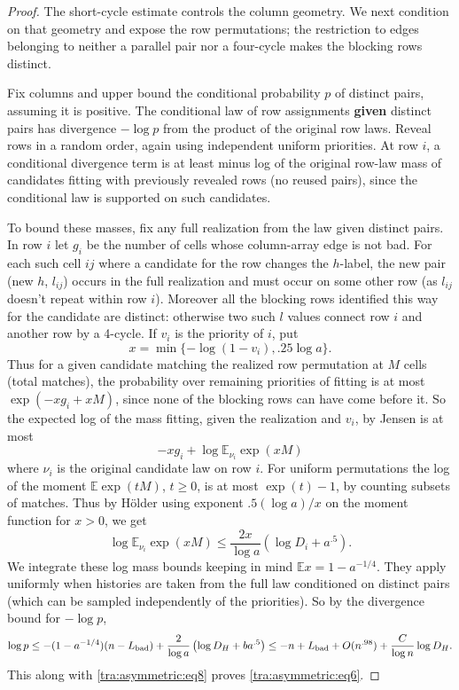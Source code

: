 \begin{proof}
The short-cycle estimate controls the column geometry. We next
condition on that geometry and expose the row permutations; the
restriction to edges belonging to neither a parallel pair nor a
four-cycle makes the blocking rows distinct.

Fix columns and upper bound the conditional probability \(p\) of distinct pairs, assuming it is positive. The conditional law of row assignments \textbf{given} distinct pairs has divergence \(-\log p\) from the product of the original row laws. Reveal rows in a random order, again using independent uniform priorities. At row \(i\), a conditional divergence term is at least minus log of the original row-law mass of candidates fitting with previously revealed rows (no reused pairs), since the conditional law is supported on such candidates.

To bound these masses, fix any full realization from the law given distinct pairs. In row \(i\) let \(g_i\) be the number of cells whose column-array edge is not bad. For each such cell \(ij\) where a candidate for the row changes the \(h\)-label, the new pair (new \(h\), \(l_{ij}\)) occurs in the full realization and must occur on some other row (as \(l_{ij}\) doesn't repeat within row \(i\)). Moreover all the blocking rows identified this way for the candidate are distinct: otherwise two such \(l\) values connect row \(i\) and another row by a 4-cycle. If \(v_i\) is the priority of \(i\), put
\[
                  x=\min\{-\log(1-v_i), .25\log a\}.
\]
Thus for a given candidate matching the realized row permutation at \(M\) cells (total matches), the probability over remaining priorities of fitting is at most
\(\exp(-x g_i+x M)\), since none of the blocking rows can have come before it. So the expected log of the mass fitting, given the realization and \(v_i\), by Jensen is at most
\[
                     -x g_i + \log\mathbb E_{\nu_i}\exp(xM)
\]
where \(\nu_i\) is the original candidate law on row \(i\). For uniform permutations the log of the moment \(\mathbb E\exp(tM)\), \(t\ge 0\), is at most \(\exp(t)-1\), by counting subsets of matches. Thus by Hölder using exponent \(.5(\log a)/x\) on the moment function for \(x>0\), we get
\[
                    \log\mathbb E_{\nu_i}\exp(xM)
                      \le \frac{2x}{\log a}(\log D_i + a^{.5}).
\]
We integrate these log mass bounds keeping in mind \(\mathbb E x=1-a^{-1/4}\). They apply uniformly when histories are taken from the full law conditioned on distinct pairs (which can be sampled independently of the priorities). So by the divergence bound for \(-\log p\),
\[
           \log p
                 \le -(1-a^{-1/4})(n-L_{\rm bad})
                       +\frac{2}{\log a}\left(\log D_H+b a^{.5}\right)
                 \le -n+ L_{\rm bad} + O(n^{.98})
                                +\frac{C}{\log n}\log D_H.
\]
This along with \eqref{tra:asymmetric:eq8} proves \eqref{tra:asymmetric:eq6}.
\end{proof}

